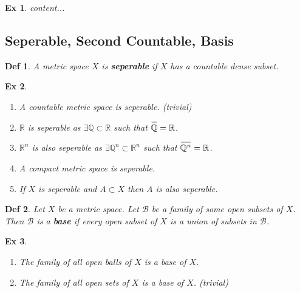 \documentclass[paper=a4, fontsize=11pt]{scrartcl}
\newcommand{\nextline}{$ $ \newline \vspace{-0.15in}}
\newcommand{\overbar}[1]{
	\mkern 1.5mu \overline{\mkern-1.5mu\raisebox{0pt}[\dimexpr\height+0.5mm\relax]{$#1$}\mkern-1.5mu}\mkern 1.5mu
}
\newtheorem{definition}{Def}
\newtheorem{example}{Ex}
\begin{document}
\begin{example}
	content...\\
\end{example}

\vspace{0.15in}
\subsection{Seperable, Second Countable, Basis}
\vspace{0.15in}

\begin{definition}
	A metric space $X$ is \textbf{seperable} if $X$ has a countable dense subset.
\end{definition}

\vspace{0.15in}

\begin{example}
\nextline
\begin{enumerate}
	\item A countable metric space is seperable. (trivial)
	\item $\mathbb{R}$ is seperable as $\exists \mathbb{Q}\subset \mathbb{R}$ such that $\overbar{\mathbb{Q}}=\mathbb{R}$.
	\item $\mathbb{R}^n$ is also seperable as $\exists \mathbb{Q}^n \subset \mathbb{R}^n$ such that $\overbar{\mathbb{Q}^n}=\mathbb{R}$.
	\item A compact metric space is seperable.
	\item If $X$ is seperable and $A \subset X$ then $A$ is also seperable.
\end{enumerate}
\end{example}

\vspace{0.15in}

\begin{definition}
	Let $X$ be a metric space. Let $\mathcal{B}$ be a family of some open subsets of $X$. Then $\mathcal{B}$ is a \textbf{base} if every open subset of $X$ is a union of subsets in $\mathcal{B}$. 
\end{definition}

\vspace{0.15in}

\begin{example}
\nextline
\begin{enumerate}
	\item The family of all open balls of $X$ is a base of $X$.
	\item The family of all open sets of $X$ is a base of $X$. (trivial)\\
\end{enumerate}
\end{example}
\end{document}
